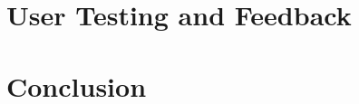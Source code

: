 \documentclass[runningheads]{llncs}
\begin{document}
\section{User Testing and Feedback} \label{sec:USER_TESTING}







\section{Conclusion} \label{sec:CONCLUSION}



\end{document}
